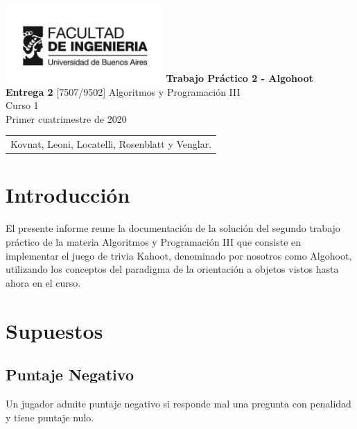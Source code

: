 \documentclass[titlepage,a4paper]{article}
\begin{document}
\begin{titlepage} %
	\hfill\includegraphics[width=6cm]{img/logofiuba.jpg}
    \centering
    \vfill
    \Huge \textbf{Trabajo Práctico 2 - Algohoot\\ Entrega 2}
    \vskip2cm
    \Large [7507/9502] Algoritmos y Programación III\\
    Curso 1\\ %
    Primer cuatrimestre de 2020 
    \vfill
    \begin{tabular}{  l  } %
      Kovnat, Leoni, Locatelli, Rosenblatt y Venglar. %
  	\end{tabular}
    \vfill
    \vfill
\end{titlepage}

\tableofcontents %
\newpage

\section{Introducción}\label{sec:intro}
El presente informe reune la documentación de la solución del segundo trabajo práctico de la materia Algoritmos y Programación III que consiste en implementar el juego de trivia Kahoot, denominado por nosotros como Algohoot, utilizando los conceptos del paradigma de la orientación a objetos vistos hasta ahora en el curso.

\section{Supuestos}\label{sec:supuestos}

\subsection{Puntaje Negativo}

Un jugador admite puntaje negativo si responde mal una pregunta con penalidad y tiene puntaje nulo. 
\end{document}
